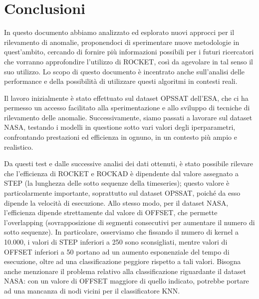 \chapter{Conclusioni}


In questo documento abbiamo analizzato ed esplorato nuovi approcci per il rilevamento di anomalie, proponendoci di sperimentare nuove metodologie in quest'ambito, cercando di fornire più informazioni possibili per i futuri ricercatori che vorranno approfondire l'utilizzo di ROCKET, così da agevolare in tal senso il suo utilizzo.
Lo scopo di questo documento è incentrato anche sull'analisi delle performance e della possibilità di utilizzare questi algoritmi in contesti reali.

Il lavoro inizialmente è stato effettuato sul dataset OPS\textunderscore SAT dell'ESA, che ci ha permesso un accesso facilitato alla sperimentazione e allo sviluppo di tecniche di rilevamento delle anomalie.
Successivamente, siamo passati a lavorare sul dataset NASA, testando i modelli in questione sotto vari valori degli iperparametri, confrontando prestazioni ed efficienza in ognuno, in un contesto più ampio e realistico.

Da questi test e dalle successive analisi dei dati ottenuti, è stato possibile rilevare che l'efficienza di ROCKET e ROCKAD è dipendente dal valore assegnato a STEP (la lunghezza delle sotto sequenze della timeseries); questo valore è particolarmente importante, soprattutto sul dataset OPS\textunderscore SAT, poiché da esso dipende la velocità di esecuzione.
Allo stesso modo, per il dataset NASA, l'efficienza dipende strettamente dal valore di OFFSET, che permette l'overlapping (sovrapposizione di segmenti consecutivi per aumentare il numero di sotto sequenze).
In particolare, osserviamo che fissando il numero di kernel a 10.000, i valori di STEP inferiori a 250 sono sconsigliati, mentre valori di OFFSET inferiori a 50 portano ad un aumento esponenziale del tempo di esecuzione, oltre ad una classificazione peggiore rispetto a tali valori.
Bisogna anche menzionare il problema relativo alla classificazione riguardante il dataset NASA: con un valore di OFFSET maggiore di quello indicato, potrebbe portare ad una mancanza di nodi vicini per il classificatore KNN.

